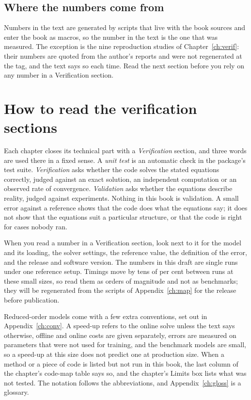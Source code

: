 \documentclass[11pt,a4paper,twoside,openany]{book}
\begin{document}
\section*{Where the numbers come from}

Numbers in the text are generated by scripts that live with the book sources and enter the book as macros, so the number in the text is the one that was measured. The exception is the nine reproduction studies of Chapter~\ref{ch:verif}: their numbers are quoted from the author's reports and were not regenerated at the tag, and the text says so each time. Read the next section before you rely on any number in a Verification section.

\chapter*{How to read the verification sections}
Each chapter closes its technical part with a \emph{Verification} section, and three words are used there in a fixed sense. A \emph{unit test} is an automatic check in the package's test suite. \emph{Verification} asks whether the code solves the stated equations correctly, judged against an exact solution, an independent computation or an observed rate of convergence. \emph{Validation} asks whether the equations describe reality, judged against experiments. Nothing in this book is validation. A small error against a reference shows that the code does what the equations say; it does not show that the equations suit a particular structure, or that the code is right for cases nobody ran.

When you read a number in a Verification section, look next to it for the model and its loading, the solver settings, the reference value, the definition of the error, and the release and software version. The numbers in this draft are single runs under one reference setup. Timings move by tens of per cent between runs at these small sizes, so read them as orders of magnitude and not as benchmarks; they will be regenerated from the scripts of Appendix~\ref{ch:map} for the release before publication.

Reduced-order models come with a few extra conventions, set out in Appendix~\ref{ch:conv}. A speed-up refers to the online solve unless the text says otherwise, offline and online costs are given separately, errors are measured on parameters that were not used for training, and the benchmark models are small, so a speed-up at this size does not predict one at production size. When a method or a piece of code is listed but not run in this book, the last column of the chapter's code-map table says so, and the chapter's Limits box lists what was not tested. The notation follows the abbreviations, and Appendix~\ref{ch:gloss} is a glossary.


{\hypersetup{linkcolor=hnavy}\tableofcontents
\listoffigures
\listoftables}
\end{document}
